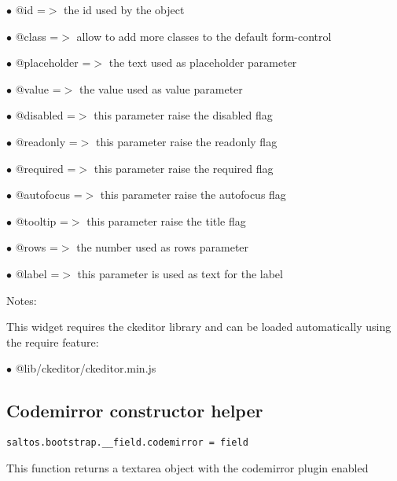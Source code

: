 \documentclass[a4paper]{book}
\begin{document}
\begin{compactitem}
\item[\color{myblue}$\bullet$] @id          =$>$ the id used by the object
\item[\color{myblue}$\bullet$] @class       =$>$ allow to add more classes to the default form-control
\item[\color{myblue}$\bullet$] @placeholder =$>$ the text used as placeholder parameter
\item[\color{myblue}$\bullet$] @value       =$>$ the value used as value parameter
\item[\color{myblue}$\bullet$] @disabled    =$>$ this parameter raise the disabled flag
\item[\color{myblue}$\bullet$] @readonly    =$>$ this parameter raise the readonly flag
\item[\color{myblue}$\bullet$] @required    =$>$ this parameter raise the required flag
\item[\color{myblue}$\bullet$] @autofocus   =$>$ this parameter raise the autofocus flag
\item[\color{myblue}$\bullet$] @tooltip     =$>$ this parameter raise the title flag
\item[\color{myblue}$\bullet$] @rows        =$>$ the number used as rows parameter
\item[\color{myblue}$\bullet$] @label       =$>$ this parameter is used as text for the label
\end{compactitem}

Notes:

This widget requires the ckeditor library and can be loaded automatically using the require
feature:

\begin{compactitem}
\item[\color{myblue}$\bullet$] @lib/ckeditor/ckeditor.min.js
\end{compactitem}

\hypertarget{toc445}{}
\subsection{Codemirror constructor helper}

\begin{lstlisting}
saltos.bootstrap.__field.codemirror = field
\end{lstlisting}

This function returns a textarea object with the codemirror plugin enabled
\end{document}
